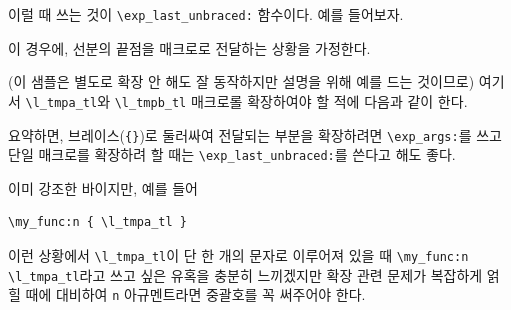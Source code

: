 \documentclass[a4paper,amsmath]{oblivoir}
\begin{document}
이럴 때 쓰는 것이 \verb|\exp_last_unbraced:| 함수이다. 예를 들어보자.

\begin{exampleonly}
\ExplSyntaxOn
{}
\ExplSyntaxOff
\end{exampleonly}

이 경우에, 선분의 끝점을 매크로로 전달하는 상황을 가정한다.

(이 샘플은 별도로 확장 안 해도 잘 동작하지만 설명을 위해 예를 드는 것이므로)
여기서 \verb|\l_tmpa_tl|와 \verb|\l_tmpb_tl| 매크로롤 확장하여야 할 적에 다음과 같이 한다.


요약하면, 브레이스(\verb|{}|)로 둘러싸여 전달되는 부분을 확장하려면 \verb|\exp_args:|를 쓰고
단일 매크로를 확장하려 할 때는 \verb|\exp_last_unbraced:|를 쓴다고 해도 좋다.

이미 강조한 바이지만, 예를 들어 
\begin{verbatim}
\my_func:n { \l_tmpa_tl }
\end{verbatim}
이런 상황에서 \verb|\l_tmpa_tl|이 단 한 개의 문자로 이루어져 있을 때 \verb|\my_func:n \l_tmpa_tl|라고 쓰고 싶은 유혹을 충분히 느끼겠지만 확장 관련 문제가 복잡하게 얽힐 때에 대비하여 \verb|n| 아규멘트라면 중괄호를 꼭 써주어야 한다. 


\vfill
\end{document}
